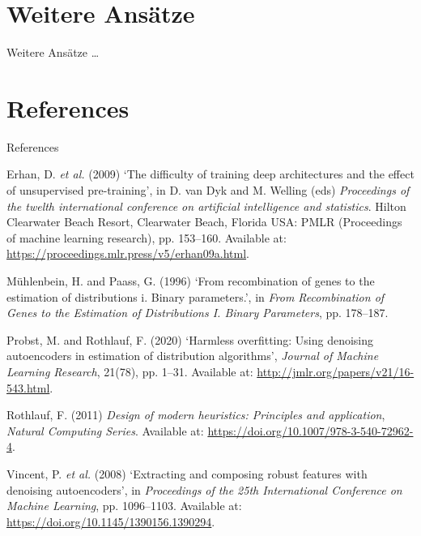 \documentclass[
  ignorenonframetext,
]{beamer}
\newlength{\cslhangindent}
\newlength{\cslentryspacingunit} %
\newenvironment{CSLReferences}[2] %
 {%
  \setlength{\parindent}{0pt}
  \ifodd #1
  \let\oldpar\par
  \def\par{\hangindent=\cslhangindent\oldpar}
  \fi
  \setlength{\parskip}{#2\cslentryspacingunit}
 }%
 {}
\begin{document}
\hypertarget{weitere-ansuxe4tze}{%
\section{Weitere Ansätze}\label{weitere-ansuxe4tze}}

\begin{frame}{Weitere Ansätze}
\ldots{}
\end{frame}

\hypertarget{references}{%
\section*{References}\label{references}}

\begin{frame}[allowframebreaks]{References}
\hypertarget{refs}{}
\begin{CSLReferences}{0}{0}
\leavevmode{}%
Erhan, D. \emph{et al.} (2009) {`The difficulty of training deep
architectures and the effect of unsupervised pre-training'}, in D. van
Dyk and M. Welling (eds) \emph{Proceedings of the twelth international
conference on artificial intelligence and statistics}. Hilton Clearwater
Beach Resort, Clearwater Beach, Florida USA: PMLR (Proceedings of
machine learning research), pp. 153--160. Available at:
\url{https://proceedings.mlr.press/v5/erhan09a.html}.

\leavevmode{}%
Mühlenbein, H. and Paass, G. (1996) {`From recombination of genes to the
estimation of distributions i. Binary parameters.'}, in \emph{From
Recombination of Genes to the Estimation of Distributions I. Binary
Parameters}, pp. 178--187.

\leavevmode{}%
Probst, M. and Rothlauf, F. (2020) {`Harmless overfitting: Using
denoising autoencoders in estimation of distribution algorithms'},
\emph{Journal of Machine Learning Research}, 21(78), pp. 1--31.
Available at: \url{http://jmlr.org/papers/v21/16-543.html}.

\leavevmode{}%
Rothlauf, F. (2011) \emph{Design of modern heuristics: Principles and
application}, \emph{Natural Computing Series}. Available at:
\url{https://doi.org/10.1007/978-3-540-72962-4}.

\leavevmode{}%
Vincent, P. \emph{et al.} (2008) {`Extracting and composing robust
features with denoising autoencoders'}, in \emph{Proceedings of the 25th
International Conference on Machine Learning}, pp. 1096--1103. Available
at: \url{https://doi.org/10.1145/1390156.1390294}.


\end{CSLReferences}
\end{frame}
\end{document}
